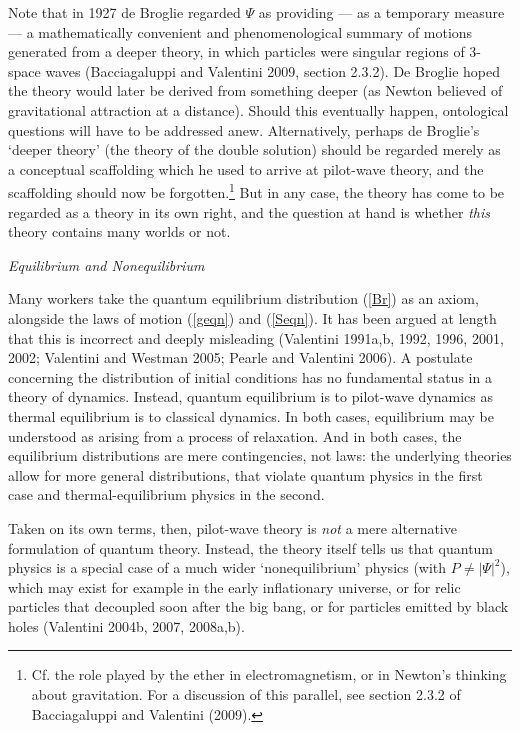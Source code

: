 \documentclass[12pt]{article}%
\begin{document}
Note that in 1927 de Broglie regarded $\Psi$ as providing --- as a temporary
measure --- a mathematically convenient and phenomenological summary of
motions generated from a deeper theory, in which particles were singular
regions of 3-space waves (Bacciagaluppi and Valentini 2009, section 2.3.2). De
Broglie hoped the theory would later be derived from something deeper (as
Newton believed of gravitational attraction at a distance). Should this
eventually happen, ontological questions will have to be addressed anew.
Alternatively, perhaps de Broglie's `deeper theory' (the theory of the double
solution) should be regarded merely as a conceptual scaffolding which he used
to arrive at pilot-wave theory, and the scaffolding should now be
forgotten.\footnote{Cf. the role played by the ether in electromagnetism, or
in Newton's thinking about gravitation. For a discussion of this parallel, see
section 2.3.2 of Bacciagaluppi and Valentini (2009).} But in any case, the
theory has come to be regarded as a theory in its own right, and the question
at hand is whether \textit{this} theory contains many worlds or not.

\begin{center}
\textit{Equilibrium and Nonequilibrium}
\end{center}

Many workers take the quantum equilibrium distribution (\ref{Br}) as an axiom,
alongside the laws of motion (\ref{geqn}) and (\ref{Seqn}). It has been argued
at length that this is incorrect and deeply misleading (Valentini 1991a,b,
1992, 1996, 2001, 2002; Valentini and Westman 2005; Pearle and Valentini
2006). A postulate concerning the distribution of initial conditions has no
fundamental status in a theory of dynamics. Instead, quantum equilibrium is to
pilot-wave dynamics as thermal equilibrium is to classical dynamics. In both
cases, equilibrium may be understood as arising from a process of relaxation.
And in both cases, the equilibrium distributions are mere contingencies, not
laws: the underlying theories allow for more general distributions, that
violate quantum physics in the first case and thermal-equilibrium physics in
the second.

Taken on its own terms, then, pilot-wave theory is \textit{not} a mere
alternative formulation of quantum theory. Instead, the theory itself tells us
that quantum physics is a special case of a much wider `nonequilibrium'
physics (with $P\neq|\Psi|^{2}$), which may exist for example in the early
inflationary universe, or for relic particles that decoupled soon after the
big bang, or for particles emitted by black holes (Valentini 2004b, 2007, 2008a,b).
\end{document}
